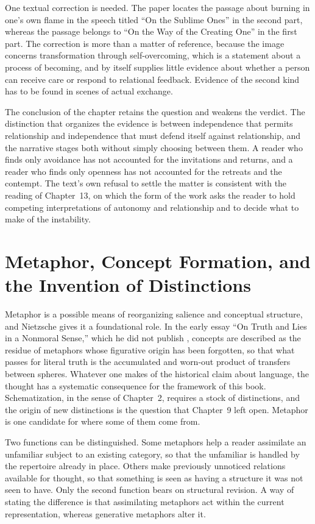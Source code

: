 One textual correction is needed. The paper locates the passage about burning in one's own flame in the speech titled ``On the Sublime Ones'' in the second part, whereas the passage belongs to ``On the Way of the Creating One'' in the first part. The correction is more than a matter of reference, because the image concerns transformation through self-overcoming, which is a statement about a process of becoming, and by itself supplies little evidence about whether a person can receive care or respond to relational feedback. Evidence of the second kind has to be found in scenes of actual exchange.

The conclusion of the chapter retains the question and weakens the verdict. The distinction that organizes the evidence is between independence that permits relationship and independence that must defend itself against relationship, and the narrative stages both without simply choosing between them. A reader who finds only avoidance has not accounted for the invitations and returns, and a reader who finds only openness has not accounted for the retreats and the contempt. The text's own refusal to settle the matter is consistent with the reading of Chapter~13, on which the form of the work asks the reader to hold competing interpretations of autonomy and relationship and to decide what to make of the instability.

\chapter{Metaphor, Concept Formation, and the Invention of Distinctions}

Metaphor is a possible means of reorganizing salience and conceptual structure, and Nietzsche gives it a foundational role. In the early essay ``On Truth and Lies in a Nonmoral Sense,'' which he did not publish \citep{nietzsche1979}, concepts are described as the residue of metaphors whose figurative origin has been forgotten, so that what passes for literal truth is the accumulated and worn-out product of transfers between spheres. Whatever one makes of the historical claim about language, the thought has a systematic consequence for the framework of this book. Schematization, in the sense of Chapter~2, requires a stock of distinctions, and the origin of new distinctions is the question that Chapter~9 left open. Metaphor is one candidate for where some of them come from.

Two functions can be distinguished. Some metaphors help a reader assimilate an unfamiliar subject to an existing category, so that the unfamiliar is handled by the repertoire already in place. Others make previously unnoticed relations available for thought, so that something is seen as having a structure it was not seen to have. Only the second function bears on structural revision. A way of stating the difference is that assimilating metaphors act within the current representation, whereas generative metaphors alter it.

